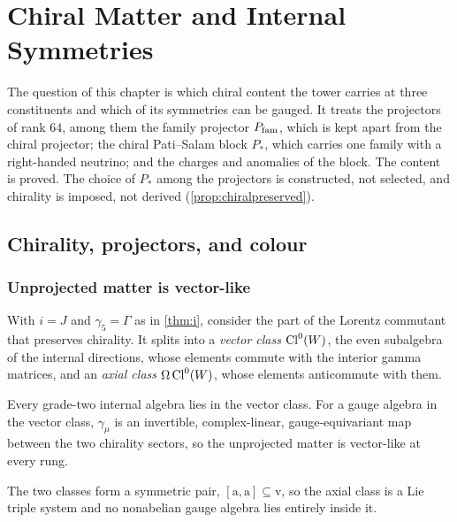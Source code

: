 \chapter{Chiral Matter and Internal Symmetries}
\label{ch:ch06_chiral}

The question of this chapter is which chiral content the tower carries at three constituents and which of its symmetries can be
gauged. It treats the projectors of rank $64$, among them the family projector $P_{\rm fam}$, which is kept apart from the chiral projector;
the chiral Pati--Salam block $P_*$, which carries one family with a right-handed neutrino; and the charges and anomalies of the block. The
content is proved. The choice of $P_*$ among the projectors is constructed, not selected, and chirality is imposed, not derived
(\cref{prop:chiralpreserved}).



\section{Chirality, projectors, and colour}
\label{sec:projectors}

\subsection{Unprojected matter is vector-like}

With $i=J$ and $\gamma_5=\Gamma$ as in \cref{thm:i}, consider the part of the Lorentz commutant that preserves chirality. It splits
into a \emph{vector class} $\mathrm{Cl}^0(W)$, the even subalgebra of the internal directions, whose elements commute with the interior gamma
matrices, and an \emph{axial class} $\Omega\,\mathrm{Cl}^0(W)$, whose elements anticommute with them.

\begin{proposition}
\label{prop:vectorlike}
Every grade-two internal algebra lies in the vector class. For a gauge algebra in the vector class, $\gamma_\mu$ is an invertible,
complex-linear, gauge-equivariant map between the two chirality sectors, so the unprojected matter is vector-like at every rung.
\end{proposition}

\begin{proposition}
\label{prop:axialtriple}
The two classes form a symmetric pair, $[\mathrm a,\mathrm a]\subseteq\mathrm v$, so the axial class is a Lie triple system and no
nonabelian gauge algebra lies entirely inside it.
\end{proposition}

